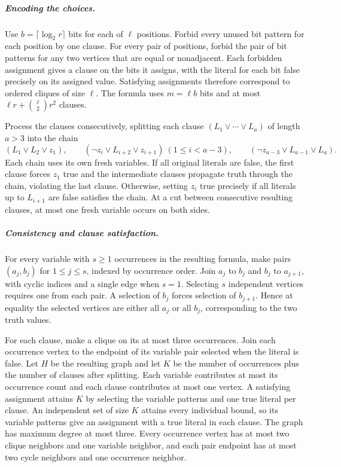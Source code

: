 \documentclass[11pt]{article}
\begin{document}
\subparagraph{Encoding the choices.}
Use \(b=\lceil\log_2 r\rceil\) bits for each of \(\ell\) positions.
Forbid every unused bit pattern for each position by one clause.
For every pair of positions, forbid the pair of bit patterns for any
two vertices that are equal or nonadjacent. Each forbidden assignment
gives a clause on the bits it assigns, with the literal for each bit
false precisely on its assigned value. Satisfying assignments therefore
correspond to ordered cliques of size \(\ell\).
The formula uses \(m=\ell b\) bits and at most
\(\ell r+\binom{\ell}{2}r^2\) clauses.

Process the clauses consecutively, splitting each clause
\((L_1\lor\cdots\lor L_a)\) of length \(a>3\) into the chain
\[
 (L_1\lor L_2\lor z_1),\qquad
 (\neg z_i\lor L_{i+2}\lor z_{i+1})\ (1\le i<a-3),\qquad
 (\neg z_{a-3}\lor L_{a-1}\lor L_a).
\]
Each chain uses its own fresh variables. If all original literals
are false, the first clause forces \(z_1\) true and the intermediate
clauses propagate truth through the chain, violating the last clause.
Otherwise, setting \(z_i\) true precisely if all literals up to
\(L_{i+1}\) are false satisfies the chain. At a cut between consecutive
resulting clauses, at most one fresh variable occurs on both sides.

\subparagraph{Consistency and clause satisfaction.}
For every variable with \(s\ge1\) occurrences in the resulting formula,
make pairs \((a_j,b_j)\) for \(1\le j\le s\), indexed by occurrence
order. Join \(a_j\) to \(b_j\) and \(b_j\) to \(a_{j+1}\), with cyclic
indices and a single edge when \(s=1\). Selecting \(s\) independent
vertices requires one from each pair. A selection of \(b_j\) forces
selection of \(b_{j+1}\). Hence at equality the selected vertices
are either all \(a_j\) or all \(b_j\), corresponding to the two truth
values.

For each clause, make a clique on its at most three occurrences.
Join each occurrence vertex to the endpoint of its variable pair
selected when the literal is false. Let \(H\) be the resulting graph
and let \(K\) be the number of occurrences plus the number of clauses
after splitting. Each variable contributes at most its occurrence
count and each clause contributes at most one vertex. A satisfying
assignment attains \(K\) by selecting the variable patterns and one
true literal per clause. An independent set of size \(K\) attains
every individual bound, so its variable patterns give an assignment
with a true literal in each clause. The graph has maximum degree at
most three. Every occurrence vertex has at most two clique neighbors
and one variable neighbor, and each pair endpoint has at most two
cycle neighbors and one occurrence neighbor.
\end{document}
